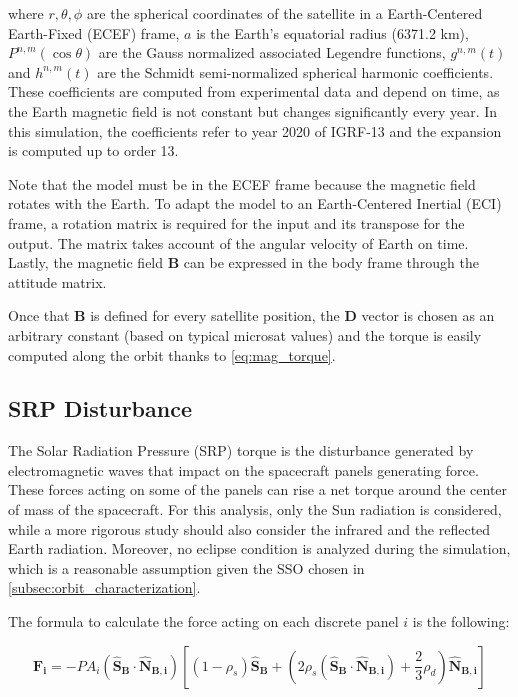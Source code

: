 where $r, \theta, \phi$ are the spherical coordinates of the satellite in a Earth-Centered Earth-Fixed (ECEF) frame, $a$ is the Earth's equatorial radius (6371.2 km), $P^{n,m} (\cos \theta)$ are the Gauss normalized associated Legendre functions, $g^{n,m} (t)$ and $h^{n,m} (t)$ are the Schmidt semi-normalized spherical harmonic coefficients.
These coefficients are computed from experimental data and depend on time, as the Earth magnetic field is not constant but changes significantly every year. In this simulation, the coefficients refer to year 2020 of IGRF-13 and the expansion is computed up to order 13.

Note that the model must be in the ECEF frame because the magnetic field rotates with the Earth. To adapt the model to an Earth-Centered Inertial (ECI) frame, a rotation matrix is required for the input and its transpose for the output. The matrix takes account of the angular velocity of Earth on time. Lastly, the magnetic field $\boldsymbol{B}$ can be expressed in the body frame through the attitude matrix.

Once that $\boldsymbol{B}$ is defined for every satellite position, the $\boldsymbol{D}$ vector is chosen as an arbitrary constant (based on typical microsat values) and the torque is easily computed along the orbit thanks to \autoref{eq:mag_torque}.


\subsection{SRP Disturbance}
\label{subsec:dist_SRP}

The Solar Radiation Pressure (SRP) torque is the disturbance generated by electromagnetic waves that impact on the spacecraft panels generating force. These forces acting on some of the panels can rise a net torque around the center of mass of the spacecraft. For this analysis, only the Sun radiation is considered, while a more rigorous study should also consider the infrared and the reflected Earth radiation. Moreover, no eclipse condition is analyzed during the simulation, which is a reasonable assumption given the SSO chosen in \autoref{subsec:orbit_characterization}.

The formula to calculate the force acting on each discrete panel $i$ is the following:

\begin{equation}
    \boldsymbol{F_i} = -P A_i \left( \boldsymbol{\hat{S}_B} \cdot \boldsymbol{\hat{N}_{B,i}} \right) \left[ \left( 1 - \rho_s \right) \boldsymbol{\hat{S}_B} + \left( 2 \rho_s \left( \boldsymbol{\hat{S}_B} \cdot \boldsymbol{\hat{N}_{B,i}} \right) + \frac{2}{3} \rho_d \right) \boldsymbol{\hat{N}_{B,i}} \right]
\end{equation}

